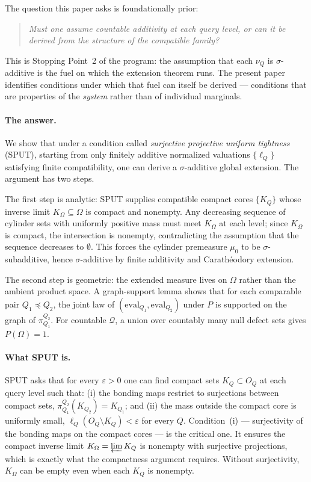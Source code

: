 \documentclass[11pt]{article}
\theoremstyle{definition}
\newcommand{\Qcal}{\mathcal{Q}}
\begin{document}
The question this paper asks is foundationally prior:

\begin{quote}
\emph{Must one assume countable additivity at each query level, or
can it be derived from the structure of the compatible family?}
\end{quote}

This is Stopping Point~2 of the program: the assumption that each
$\nu_Q$ is $\sigma$-additive is the fuel on which the extension
theorem runs.  The present paper identifies conditions under which
that fuel can itself be derived --- conditions that are properties
of the \emph{system} rather than of individual marginals.

\paragraph{The answer.}
We show that under a condition called \emph{surjective projective
uniform tightness} (SPUT), starting from only finitely additive
normalized valuations $\{\ell_Q\}$ satisfying finite compatibility,
one can derive a $\sigma$-additive global extension.  The argument has
two steps.

The first step is analytic: SPUT supplies compatible compact cores
$\{K_Q\}$ whose inverse limit $K_\Omega \subseteq \Omega$ is compact
and nonempty.  Any decreasing sequence of cylinder sets with uniformly
positive mass must meet $K_\Omega$ at each level; since
$K_\Omega$ is compact, the intersection is nonempty, contradicting
the assumption that the sequence decreases to $\emptyset$.  This
forces the cylinder premeasure $\mu_0$ to be $\sigma$-subadditive,
hence $\sigma$-additive by finite additivity and Carath\'eodory
extension.

The second step is geometric: the extended measure lives on $\Omega$
rather than the ambient product space.  A graph-support lemma shows
that for each comparable pair $Q_1 \preceq Q_2$, the joint law of
$(\mathrm{eval}_{Q_1}, \mathrm{eval}_{Q_2})$ under $P$ is
supported on the graph of $\pi^{Q_2}_{Q_1}$.  For countable
$\Qcal$, a union over countably many null defect sets gives
$P(\Omega) = 1$.

\paragraph{What SPUT is.}
SPUT asks that for every $\varepsilon > 0$ one can find compact sets
$K_Q \subset O_Q$ at each query level such that: (i) the
bonding maps restrict to surjections between compact sets,
$\pi^{Q_2}_{Q_1}(K_{Q_2}) = K_{Q_1}$; and (ii) the mass outside
the compact core is uniformly small, $\ell_Q(O_Q \setminus K_Q) <
\varepsilon$ for every $Q$.  Condition~(i) --- surjectivity of the
bonding maps on the compact cores --- is the critical one.  It ensures
the compact inverse limit $K_\Omega = \varprojlim K_Q$ is nonempty
with surjective projections, which is exactly what the compactness
argument requires.  Without surjectivity, $K_\Omega$ can be empty
even when each $K_Q$ is nonempty.
\end{document}
